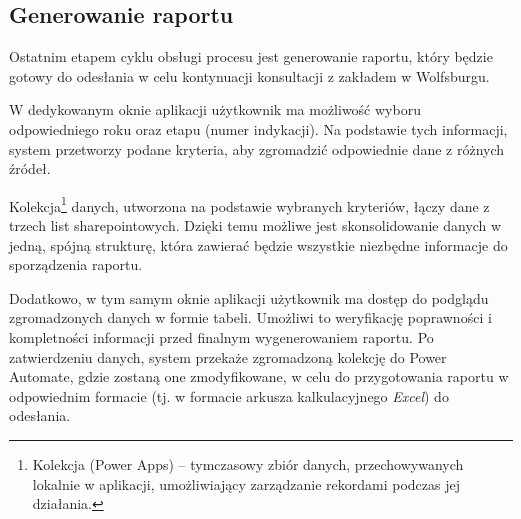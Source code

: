 \subsection{Generowanie raportu}

Ostatnim etapem cyklu obsługi procesu jest generowanie raportu, który będzie gotowy do odesłania w celu kontynuacji konsultacji z zakładem w Wolfsburgu. 

W dedykowanym oknie aplikacji użytkownik ma możliwość wyboru odpowiedniego roku oraz etapu (numer indykacji). Na podstawie tych informacji, system przetworzy podane kryteria, aby zgromadzić odpowiednie dane z różnych źródeł.

Kolekcja\footnote{Kolekcja (Power Apps) -- tymczasowy zbiór danych, przechowywanych lokalnie w aplikacji, umożliwiający zarządzanie rekordami podczas jej działania.} danych, utworzona na podstawie wybranych kryteriów, łączy dane z trzech list sharepointowych. Dzięki temu możliwe jest skonsolidowanie danych w jedną, spójną strukturę, która zawierać będzie wszystkie niezbędne informacje do sporządzenia raportu. 

Dodatkowo, w tym samym oknie aplikacji użytkownik ma dostęp do podglądu zgromadzonych danych w formie tabeli. Umożliwi to weryfikację poprawności i kompletności informacji przed finalnym wygenerowaniem raportu. Po zatwierdzeniu danych, system przekaże zgromadzoną kolekcję do Power Automate, gdzie zostaną one  zmodyfikowane, w celu do przygotowania raportu w odpowiednim formacie (tj. w formacie arkusza kalkulacyjnego \textit{Excel}) do odesłania.
